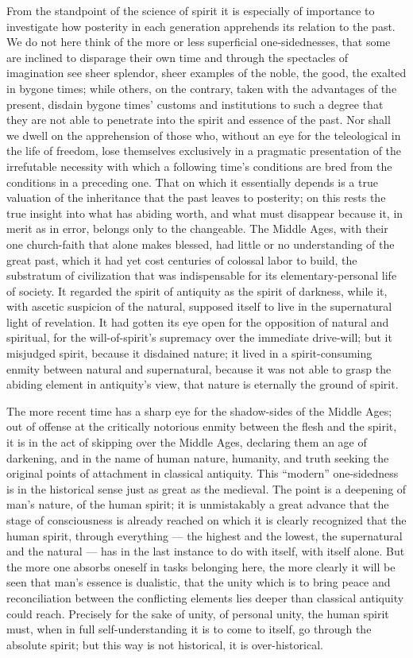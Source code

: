 \documentclass[12pt]{book}
\begin{document}
From the standpoint of the science of spirit it is especially of importance to investigate how
posterity in each generation apprehends its relation to the past. We do not here think of the more
or less superficial one-sidednesses, that some are inclined to disparage their own time and through
the spectacles of imagination see sheer splendor, sheer examples of the noble, the good, the exalted
in bygone times; while others, on the contrary, taken with the advantages of the present, disdain
bygone times' customs and institutions to such a degree that they are not able to penetrate into the
spirit and essence of the past. Nor shall we dwell on the apprehension of those who, without an eye
for the teleological in the life of freedom, lose themselves exclusively in a pragmatic presentation
of the irrefutable necessity with which a following time's conditions are bred from the conditions in
a preceding one. That on which it essentially depends is a true valuation of the inheritance that the
past leaves to posterity; on this rests the true insight into what has abiding worth, and what must
disappear because it, in merit as in error, belongs only to the changeable. The Middle Ages, with
their one church-faith that alone makes blessed, had little or no understanding of the great past,
which it had yet cost centuries of colossal labor to build, the substratum of civilization that was
indispensable for its elementary-personal life of society. It regarded the spirit of antiquity as
the spirit of darkness, while it, with ascetic suspicion of the natural, supposed itself to live in
the supernatural light of revelation. It had gotten its eye open for the opposition of natural and
spiritual, for the will-of-spirit's supremacy over the immediate drive-will; but it misjudged
spirit, because it disdained nature; it lived in a spirit-consuming enmity between natural and
supernatural, because it was not able to grasp the abiding element in antiquity's view, that nature
is eternally the ground of spirit.

The more recent time has a sharp eye for the shadow-sides of the Middle Ages; out of offense at the
critically notorious enmity between the flesh and the spirit, it is in the act of skipping over the
Middle Ages, declaring them an age of darkening, and in the name of human nature, humanity, and
truth seeking the original points of attachment in classical antiquity. This ``modern''
one-sidedness is in the historical sense just as great as the medieval. The point is a deepening of
man's nature, of the human spirit; it is unmistakably a great advance that the stage of consciousness
is already reached on which it is clearly recognized that the human spirit, through everything --- the
highest and the lowest, the supernatural and the natural --- has in the last instance to do with
itself, with itself alone. But the more one absorbs oneself in tasks belonging here, the more clearly
it will be seen that man's essence is dualistic, that the unity which is to bring peace and
reconciliation between the conflicting elements lies deeper than classical antiquity could reach.
Precisely for the sake of unity, of personal unity, the human spirit must, when in full
self-understanding it is to come to itself, go through the absolute spirit; but this way is not
historical, it is over-historical.
\end{document}
